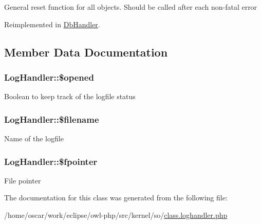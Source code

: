 General reset function for all objects. Should be called after each non-fatal error 

Reimplemented in \hyperlink{classDbHandler_9982df4830f05803935bb31bac7fae3d}{DbHandler}.

\subsection{Member Data Documentation}
\hypertarget{classLogHandler_956e7e71a9ff96c6301d1f41a5bf207e}{
\subsubsection{\setlength{\rightskip}{0pt plus 5cm}LogHandler::\$opened}}
\label{classLogHandler_956e7e71a9ff96c6301d1f41a5bf207e}


Boolean to keep track of the logfile status \hypertarget{classLogHandler_b51c12bcd654093b9d0153ab38ebad8c}{
\subsubsection{\setlength{\rightskip}{0pt plus 5cm}LogHandler::\$filename}}
\label{classLogHandler_b51c12bcd654093b9d0153ab38ebad8c}


Name of the logfile \hypertarget{classLogHandler_d65c8954bda40d8a33828f0a0a2cbf5b}{
\subsubsection{\setlength{\rightskip}{0pt plus 5cm}LogHandler::\$fpointer}}
\label{classLogHandler_d65c8954bda40d8a33828f0a0a2cbf5b}


File pointer 

The documentation for this class was generated from the following file:\begin{CompactItemize}
\item 
/home/oscar/work/eclipse/owl-php/src/kernel/so/\hyperlink{class_8loghandler_8php}{class.loghandler.php}\end{CompactItemize}
